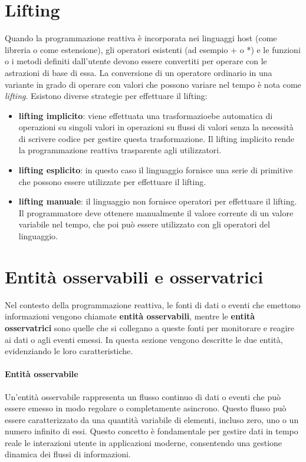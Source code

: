 \documentclass[12pt,a4paper,openright,twoside]{book}
\begin{document}
\section{Lifting}
Quando la programmazione reattiva è incorporata nei linguaggi host (come libreria o come estensione), gli operatori esistenti (ad esempio + o *) e le funzioni o i metodi definiti dall'utente devono essere convertiti per operare con le astrazioni di base di essa. 
La conversione di un operatore ordinario in una variante in grado di operare con valori che possono variare nel tempo è nota come \textit{lifting}. 
Esistono diverse strategie per effettuare il lifting: 
\begin{itemize}
    \item \textbf{lifting implicito}: viene effettuata una trasformazioebe automatica di operazioni su singoli valori in operazioni su flussi di valori senza la necessità di scrivere codice per gestire questa trasformazione. Il lifting implicito rende la programmazione reattiva trasparente agli utilizzatori. 
    \item \textbf{lifting esplicito}: in questo caso il linguaggio fornisce una serie di primitive che possono essere utilizzate per effettuare il lifting.
    \item \textbf{lifting manuale}: il linguaggio non fornisce operatori per effettuare il lifting. Il programmatore deve ottenere manualmente il valore corrente di un valore variabile nel tempo, che poi può essere utilizzato con gli operatori del linguaggio. 
\end{itemize}

\section{Entità osservabili e osservatrici}
Nel contesto della programmazione reattiva, le fonti di dati o eventi che emettono informazioni vengono chiamate \textbf{entità osservabili}, mentre le \textbf{entità osservatrici} sono quelle che si collegano a queste fonti per monitorare e reagire ai dati o agli eventi emessi. In questa sezione vengono descritte le due entità, evidenziando le loro caratteristiche. 
\paragraph{Entità osservabile}
Un'entità osservabile rappresenta un flusso continuo di dati o eventi che può essere emesso in modo regolare o completamente asincrono. Questo flusso può essere caratterizzato da una quantità variabile di elementi, incluso zero, uno o un numero infinito di essi. Questo concetto è fondamentale per gestire dati in tempo reale le interazioni utente in applicazioni moderne, consentendo una gestione dinamica dei flussi di informazioni.
\end{document}

